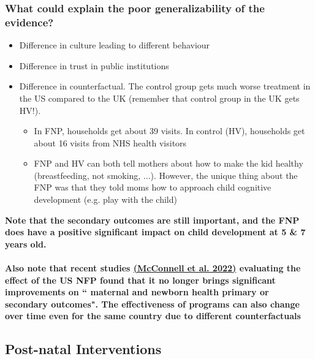         \subsubsection{What could explain the poor generalizability of the evidence?}
            \begin{itemize}
                \item Difference in culture leading to different behaviour
                \item Difference in trust in public institutions
                \item Difference in counterfactual. The control group gets much worse treatment in the US compared to the UK (remember that control group in the UK gets HV!).
                \begin{itemize}
                    \item In FNP, households get about 39 visits. In control (HV), households get about 16 visits from NHS health visitors
                    \item FNP and HV can both tell mothers about how to make the kid healthy (breastfeeding, not smoking, ...). However, the unique thing about the FNP was that they told moms how to approach child cognitive development (e.g. play with the child)
                \end{itemize}
            \end{itemize}
            \textbf{Note that the secondary outcomes are still important, and the FNP does have a positive significant impact on child development at 5 \& 7 years old.}\\ \\
            \textbf{Also note that recent studies \href{https://jamanetwork.com/journals/jama/article-abstract/2793825?casa_token=hmQ4aJAMtL8AAAAA:22C4Pg2uXeayMj306ws_iqVE56LIoViTQfKUWIhJoXNQ4S9YLAZofvhEgmKVeFYWdOQ3800Tcj4}{(McConnell et al. 2022)} evaluating the effect of the US NFP found that it no longer brings significant improvements on `` maternal and newborn health primary or secondary outcomes". The effectiveness of programs can also change over time even for the same country due to different counterfactuals} 

    \subsection{Post-natal Interventions}
    
